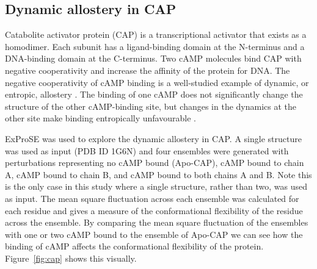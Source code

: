 \begin{table}


\end{table}


\subsection{Dynamic allostery in CAP}

Catabolite activator protein (CAP) is a transcriptional activator that exists as a homodimer.
Each subunit has a ligand-binding domain at the N-terminus and a DNA-binding domain at the C-terminus.
Two cAMP molecules bind CAP with negative cooperativity and increase the affinity of the protein for DNA.
The negative cooperativity of cAMP binding is a well-studied example of dynamic, or entropic, allostery \cite{Popovych2006}.
The binding of one cAMP does not significantly change the structure of the other cAMP-binding site, but changes in the dynamics at the other site make binding entropically unfavourable \cite{Popovych2006, Louet2015}.

ExProSE was used to explore the dynamic allostery in CAP.
A single structure was used as input (PDB ID 1G6N) and four ensembles were generated with perturbations representing no cAMP bound (Apo-CAP), cAMP bound to chain A, cAMP bound to chain B, and cAMP bound to both chains A and B.
Note this is the only case in this study where a single structure, rather than two, was used as input.
The mean square fluctuation across each ensemble was calculated for each residue and gives a measure of the conformational flexibility of the residue across the ensemble.
By comparing the mean square fluctuation of the ensembles with one or two cAMP bound to the ensemble of Apo-CAP we can see how the binding of cAMP affects the conformational flexibility of the protein.
Figure~\ref{fig:cap} shows this visually.


